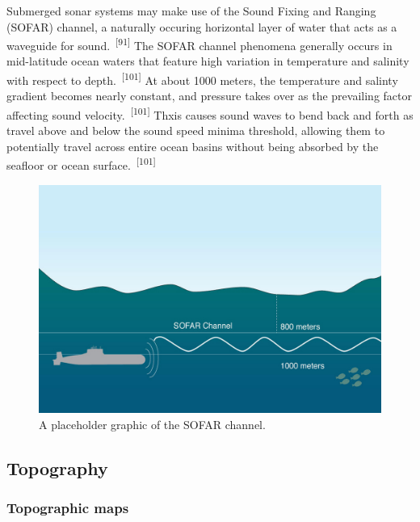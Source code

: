 \documentclass{article}
\begin{document}

\par{Submerged sonar systems may make use of the Sound Fixing and Ranging (SOFAR) channel, a naturally occuring horizontal layer of water that acts as a waveguide for sound.~\textsuperscript{[91]} The SOFAR channel phenomena generally occurs in mid-latitude ocean waters that feature high variation in temperature and salinity with respect to depth.~\textsuperscript{[101]} At about 1000 meters, the temperature and salinty gradient becomes nearly constant, and pressure takes over as the prevailing factor affecting sound velocity.~\textsuperscript{[101]} Thxis causes sound waves to bend back and forth as travel above and below the sound speed minima threshold, allowing them to potentially travel across entire ocean basins without being absorbed by the seafloor or ocean surface.~\textsuperscript{[101]}}


\begin{figure}
    \centering
    \includegraphics[width=1.0\linewidth]{images/sofar.jpg}
    \caption{A placeholder graphic of the SOFAR channel.}
    \label{figure27}
\end{figure}


\subsection{Topography}

\subsubsection{Topographic maps}
\end{document}

